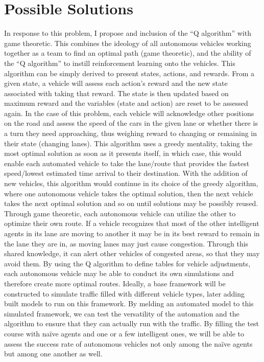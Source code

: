 \documentclass[letterpaper,10pt,draftclsnofoot,onecolumn]{IEEEtran} %
\begin{document}
\section{Possible Solutions}
In response to this problem, I propose and inclusion of the “Q algorithm” with game theoretic. This combines the ideology of all autonomous vehicles working together as a team to find an optimal path (game theoretic), and the ability of the “Q algorithm” to instill reinforcement learning onto the vehicles. This algorithm can be simply derived to present states, actions, and rewards. From a given state, a vehicle will assess each action’s reward and the new state associated with taking that reward. The state is then updated based on maximum reward and the variables (state and action) are reset to be assessed again. In the case of this problem, each vehicle will acknowledge other positions on the road and assess the speed of the cars in the given lane or whether there is a turn they need approaching, thus weighing reward to changing or remaining in their state (changing lanes). This algorithm uses a greedy mentality, taking the most optimal solution as soon as it presents itself, in which case, this would enable each automated vehicle to take the lane/route that provides the fastest speed/lowest estimated time arrival to their destination. With the addition of new vehicles, this algorithm would continue in its choice of the greedy algorithm, where one autonomous vehicle takes the optimal solution, then the next vehicle takes the next optimal solution and so on until solutions may be possibly reused. Through game theoretic, each autonomous vehicle can utilize the other to optimize their own route. If a vehicle recognizes that most of the other intelligent agents in its lane are moving to another it may be in its best reward to remain in the lane they are in, as moving lanes may just cause congestion. Through this shared knowledge, it can alert other vehicles of congested areas, so that they may avoid them. By using the Q algorithm to define tables for vehicle adjustments, each autonomous vehicle may be able to conduct its own simulations and therefore create more optimal routes. Ideally, a base framework will be constructed to simulate traffic filled with different vehicle types, later adding built models to run on this framework. By melding an automated model to this simulated framework, we can test the versatility of the automation and the algorithm to ensure that they can actually run with the traffic. By filling the test course with naïve agents and one or a few intelligent ones, we will be able to assess the success rate of autonomous vehicles not only among the naïve agents but among one another as well.
\end{document}

